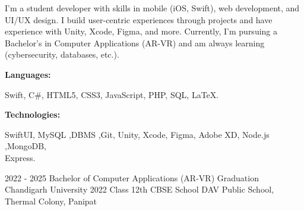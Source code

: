 \documentclass[9pt]{developercv} %
\begin{document}
\begin{minipage}[t]{0.45\textwidth} %
         I'm a student developer with skills in mobile (iOS, Swift), web development, and UI/UX design. I build user-centric experiences through projects and have experience with Unity, Xcode, Figma, and more. Currently, I'm pursuing a Bachelor's in Computer Applications (AR-VR) and am always learning (cybersecurity, databases, etc.).
\end{minipage}
\hfill %
\begin{minipage}[t]{0.465\textwidth}
    \vspace{-6pt}
    
    \begin{minipage}[t]{0.2\textwidth}
        \textbf{Languages:}
    \end{minipage}
    \hfill
    \begin{minipage}[t]{0.73\textwidth}
        Swift, C\#, HTML5, CSS3, JavaScript, PHP, SQL, LaTeX.  
    \end{minipage}
    \vspace{4mm}
    
    \begin{minipage}[t]{0.2\textwidth}
        \textbf{Technologies:}
    \end{minipage}
    \hfill
    \begin{minipage}[t]{0.73\textwidth}
        SwiftUI, MySQL ,DBMS ,Git, Unity, Xcode, Figma, Adobe XD, Node.js ,MongoDB,\\Express.
    \end{minipage}
    
\end{minipage}


\vspace{-8 pt}
\begin{entrylist}
    \entry
		{2022 - 2025}
		{Bachelor of Computer Applications (AR-VR)}
		{Graduation}
		{Chandigarh University}
    \entry
		{2022}
		{Class 12th CBSE }
		{School}
	 	{DAV Public School, Thermal Colony, Panipat}
\end{entrylist}
\end{document}
